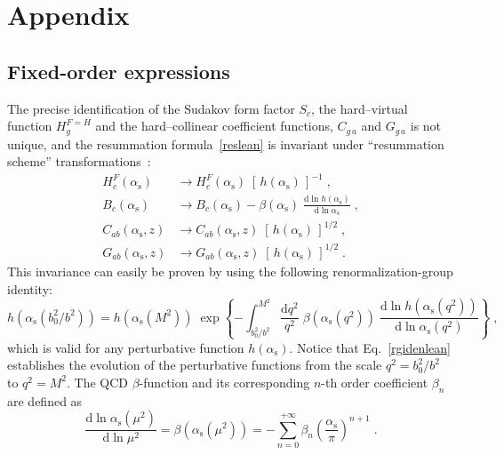 \documentclass[12pt]{article}
\DeclareRobustCommand{\nn}{\nonumber}
\DeclareRobustCommand{\alphas}{\ensuremath{\alpha_{\mathrm{s}}}\xspace}
\DeclareRobustCommand{\as}{\alphas}
\DeclareRobustCommand{\rd}{\ensuremath{\mathrm{d}}}
\begin{document}
\newpage
\section*{Appendix}
\begin{appendix}


\section{Fixed-order expressions}
\label{app:fixed-order}

The precise identification of the Sudakov form factor $S_c$, the hard--virtual function 
$H_g^{F=H}$ and the hard--collinear coefficient functions, $C_{g\, a}$ and $G_{g\, a}$ is not unique, and the resummation formula~\eqref{reslean} is invariant under ``resummation scheme''  transformations~\cite{Catani:2000vq}:
\begin{align}
  H_c^{F}(\as) &\to
  H_c^{F}(\as) \; \left[ \, h(\as) \, \right]^{-1} \;,
  \nn\\
  B_c(\as) &\to 
  B_c(\as) - \beta(\as) \;\frac{\rd\ln h(\as)}{\rd\ln \as} \;,
  \nn\\
  C_{ab}(\as,z) &\to
  C_{ab}(\as,z) \; \left[ \, h(\as) \, \right]^{1/2} \;,
  \nn\\
  G_{ab}(\as,z) &\to
  G_{ab}(\as,z) \;\left[ \, h(\as) \, \right]^{1/2} \;. 
  \label{restranf}
\end{align}
This invariance can easily be proven by using the following renormalization-group identity:
\begin{equation}
  h(\as(b_0^2/b^2)) = 
  h(\as(M^2)) \; \exp \left\{ 
    -\int_{b_0^2/b^2}^{M^2} \frac{\rd q^2}{q^2} 
    \;\beta(\as(q^2)) \;\frac{\rd \ln h(\as(q^2))}{\rd \ln \as(q^2)} 
  \right\} \;,
  \label{rgidenlean}
\end{equation}
which is valid for any perturbative function $h(\as)$. Notice that Eq.~\eqref{rgidenlean} establishes the evolution of the perturbative functions from the scale $q^{2}=b_0^2/b^2$ to $q^{2}=M^2$. The QCD $\beta$-function and its corresponding $n$-th order coefficient $\beta_n$ are defined as
\begin{equation}
  \frac{\rd \ln \as(\mu^2)}{\rd \ln \mu^2} = 
  \beta(\as(\mu^2)) = 
  - \sum_{n=0}^{+\infty} \beta_n \left( \frac{\as}{\pi} \right)^{n+1} \;.
  \label{rge}
\end{equation}

\end{appendix}
\end{document}
